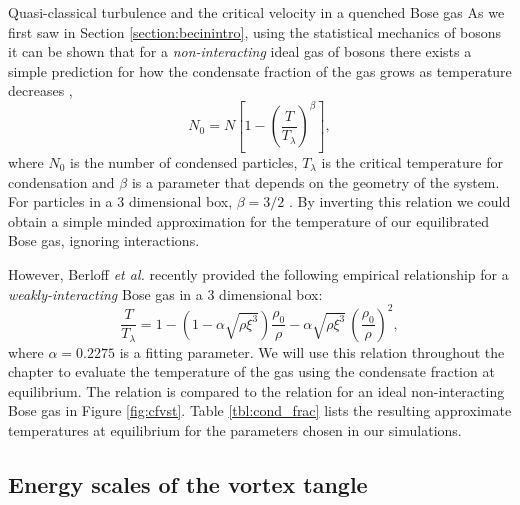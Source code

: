 \begin{chapter}{\label{cha:nonequib}Quasi-classical turbulence and the critical velocity in a quenched Bose gas}
As we first saw in Section \ref{section:becinintro}, using the statistical mechanics of bosons it can be shown that for a {\it non-interacting} ideal gas of bosons there exists a simple prediction for how the condensate fraction of the gas grows as temperature decreases \cite{Pethick},
\begin{equation}
N_0 = N \left [ 1-\left ( \frac{T}{T_\lambda} \right )^\beta \right ],
\end{equation}
where $N_0$ is the number of condensed particles, $T_{\lambda}$ is the critical temperature for condensation and $\beta$ is a parameter that depends on the geometry of the system. For particles in a 3 dimensional box, $\beta=3/2$ \cite{Pethick}. By inverting this relation we could obtain a simple minded approximation for the temperature of our equilibrated Bose gas, ignoring interactions.

However, Berloff {\it et al.} \cite{berloff_2007} recently provided the following empirical relationship for a {\it weakly-interacting} Bose gas in a 3 dimensional box:
\begin{equation}
  \frac{T}{T_\lambda} = 1 - \left (1 - \alpha\sqrt{\rho\xi^3}\right)\frac{\rho_0}{\rho} - \alpha\sqrt{\rho\xi^3}\,\left(\frac{\rho_0}{\rho}\right)^2,
  \label{eq:temp}
\end{equation}
where $\alpha=0.2275$ is a fitting parameter. We will use this relation throughout the chapter to evaluate the temperature of the gas using the condensate fraction at equilibrium. The relation is compared to the relation for an ideal non-interacting Bose gas in Figure \ref{fig:cfvst}. Table \ref{tbl:cond_frac} lists the resulting approximate temperatures at equilibrium for the parameters chosen in our simulations.

\subsection{Energy scales of the vortex tangle}



\end{chapter}
